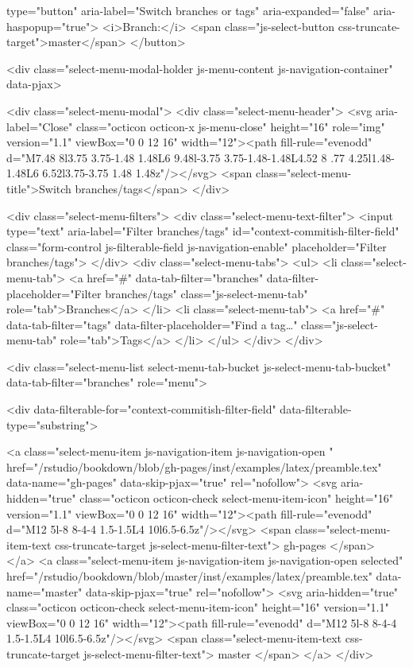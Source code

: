     type="button" aria-label="Switch branches or tags" aria-expanded="false" aria-haspopup="true">
      <i>Branch:</i>
      <span class="js-select-button css-truncate-target">master</span>
  </button>

  <div class="select-menu-modal-holder js-menu-content js-navigation-container" data-pjax>

    <div class="select-menu-modal">
      <div class="select-menu-header">
        <svg aria-label="Close" class="octicon octicon-x js-menu-close" height="16" role="img" version="1.1" viewBox="0 0 12 16" width="12"><path fill-rule="evenodd" d="M7.48 8l3.75 3.75-1.48 1.48L6 9.48l-3.75 3.75-1.48-1.48L4.52 8 .77 4.25l1.48-1.48L6 6.52l3.75-3.75 1.48 1.48z"/></svg>
        <span class="select-menu-title">Switch branches/tags</span>
      </div>

      <div class="select-menu-filters">
        <div class="select-menu-text-filter">
          <input type="text" aria-label="Filter branches/tags" id="context-commitish-filter-field" class="form-control js-filterable-field js-navigation-enable" placeholder="Filter branches/tags">
        </div>
        <div class="select-menu-tabs">
          <ul>
            <li class="select-menu-tab">
              <a href="#" data-tab-filter="branches" data-filter-placeholder="Filter branches/tags" class="js-select-menu-tab" role="tab">Branches</a>
            </li>
            <li class="select-menu-tab">
              <a href="#" data-tab-filter="tags" data-filter-placeholder="Find a tag…" class="js-select-menu-tab" role="tab">Tags</a>
            </li>
          </ul>
        </div>
      </div>

      <div class="select-menu-list select-menu-tab-bucket js-select-menu-tab-bucket" data-tab-filter="branches" role="menu">

        <div data-filterable-for="context-commitish-filter-field" data-filterable-type="substring">


            <a class="select-menu-item js-navigation-item js-navigation-open "
               href="/rstudio/bookdown/blob/gh-pages/inst/examples/latex/preamble.tex"
               data-name="gh-pages"
               data-skip-pjax="true"
               rel="nofollow">
              <svg aria-hidden="true" class="octicon octicon-check select-menu-item-icon" height="16" version="1.1" viewBox="0 0 12 16" width="12"><path fill-rule="evenodd" d="M12 5l-8 8-4-4 1.5-1.5L4 10l6.5-6.5z"/></svg>
              <span class="select-menu-item-text css-truncate-target js-select-menu-filter-text">
                gh-pages
              </span>
            </a>
            <a class="select-menu-item js-navigation-item js-navigation-open selected"
               href="/rstudio/bookdown/blob/master/inst/examples/latex/preamble.tex"
               data-name="master"
               data-skip-pjax="true"
               rel="nofollow">
              <svg aria-hidden="true" class="octicon octicon-check select-menu-item-icon" height="16" version="1.1" viewBox="0 0 12 16" width="12"><path fill-rule="evenodd" d="M12 5l-8 8-4-4 1.5-1.5L4 10l6.5-6.5z"/></svg>
              <span class="select-menu-item-text css-truncate-target js-select-menu-filter-text">
                master
              </span>
            </a>
        </div>

